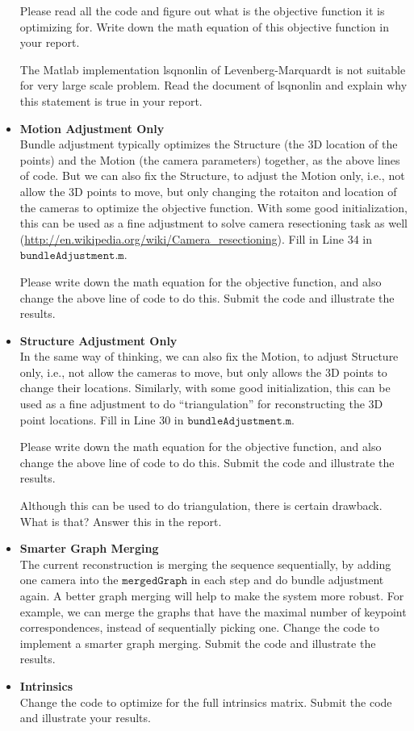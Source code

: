 \documentclass[11pt]{article}
\begin{document}
\begin{itemize}
{Please read all the code and figure out what is the objective function it is optimizing for. Write down the math equation of this objective function in your report.

The Matlab implementation lsqnonlin of Levenberg-Marquardt is not suitable for very large scale problem. Read the document of lsqnonlin and explain why this statement is true in your report.}

\item{{\bf{Motion Adjustment Only}}\\
Bundle adjustment typically optimizes the Structure (the 3D location of the points) and the Motion (the camera parameters) together, as the above lines of code. But we can also fix the Structure, to adjust the Motion only, i.e., not allow the 3D points to move, but only changing the rotaiton and location of the cameras to optimize the objective function. With some good initialization, this can be used as a fine adjustment to solve camera resectioning task as well (\url{http://en.wikipedia.org/wiki/Camera_resectioning}). Fill in Line 34 in $\texttt{bundleAdjustment.m.}$

Please write down the math equation for the objective function, and also change the above line of code to do this. Submit the code and illustrate the results.}

\item{{\bf{Structure Adjustment Only}}\\
In the same way of thinking, we can also fix the Motion, to adjust Structure only, i.e., not allow the cameras to move, but only allows the 3D points to change their locations. Similarly, with some good initialization, this can be used as a fine adjustment to do ``triangulation'' for reconstructing the 3D point locations. Fill in Line 30 in $\texttt{bundleAdjustment.m}$.

Please write down the math equation for the objective function, and also change the above line of code to do this. Submit the code and illustrate the results.

Although this can be used to do triangulation, there is certain drawback. What is that? Answer this in the report.}


\item{{\bf{Smarter Graph Merging}}\\
The current reconstruction is merging the sequence sequentially, by adding one camera into the $\texttt{mergedGraph}$ in each step and do bundle adjustment again. A better graph merging will help to make the system more robust. For example, we can merge the graphs that have the maximal number of keypoint correspondences, instead of sequentially picking one. Change the code to implement a smarter graph merging. Submit the code and illustrate the results.}

\item{{\bf{Intrinsics}}\\
Change the code to optimize for the full intrinsics matrix. Submit the code and illustrate your results.}
\end{itemize}
\end{document}
